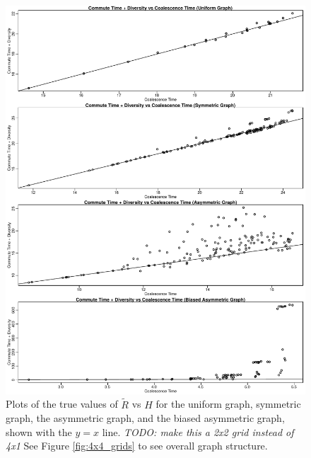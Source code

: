 \documentclass{article}
\newcommand{\comdist}{\widetilde R}
\newcommand{\plr}[1]{{\em \color{blue} #1}}
\begin{document}
\begin{figure}
\centering
     \includegraphics[scale=.8]{figs/4x4coalvcomH}
    \caption{Plots of the true values of $\comdist$ vs $H$ 
    for the uniform graph, symmetric graph, the asymmetric graph,
    and the biased asymmetric graph, 
    shown with the $y=x$ line.
    \plr{TODO: make this a 2x2 grid instead of 4x1}
    See Figure \ref{fig:4x4_grids} to see overall graph structure.}
    \label{fig:4x4coalvcomH}
\end{figure}
\end{document}
